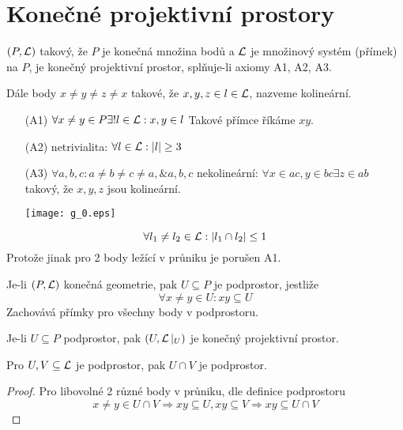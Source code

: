 \section{\texorpdfstring{Konečné projektivní prostory}{Konečné projektivní prostory}}

\begin{definition}\label{kpp:kpp}
    $(P,\operatorname{\mathcal{L}})$ takový, že $P$ je konečná množina bodů a $\operatorname{\mathcal{L}}$ je množinový systém (přímek) na $P$, je konečný projektivní prostor, splňuje-li axiomy A1, A2, A3.

    Dále body $x\neq y\neq z\neq x$ takové, že $x,y,z\in l\in\operatorname{\mathcal{L}}$, nazveme kolineární.

    \begin{itemize}
        \item[(A1)] $\forall x\neq y\in P\exists! l\in \operatorname{\mathcal{L}}: x,y\in l$
		Takové přímce říkáme $xy$.
        \item[(A2)] netrivialita: $\forall l \in \operatorname{\mathcal{L}}: |l| \geq 3$
	\item[(A3)]  $\forall a,b,c: a\neq b\neq c\neq a, \& a,b,c$ nekolineární: $\forall x\in ac, y\in bc\exists z\in ab$ takový, že $x,y,z$ jsou kolineární.

	\texttt{[image: g\_0.eps]}
    \end{itemize}
\end{definition}

\begin{observation}
	\[ \forall l_1 \ne l_2 \in \operatorname{\mathcal{L}} : |l_1 \cap l_2| \leq 1\]
	Protože jinak pro 2 body ležící v průniku je porušen A1.
\end{observation}

\begin{definition}[Podprostor]\label{kpp:subspace}
    Je-li $(P, \operatorname{\mathcal{L}})$ konečná geometrie, pak $U \subseteq P$ je podprostor, jestliže
    \[ \forall x\neq y\in U: xy\subseteq U \]
    Zachovává přímky pro všechny body v podprostoru.
\end{definition}

\begin{note}
    Je-li $U\subseteq P$ podprostor, pak $(U,\operatorname{\mathcal{L}}|_U)$ je konečný projektivní prostor.
\end{note}

\begin{lemma}
    Pro $U,V\subseteq \operatorname{\mathcal{L}}$ je podprostor, pak $U\cap V$ je podprostor.
\end{lemma}
\begin{proof}
	Pro libovolné 2 různé body v průniku, dle definice podprostoru
	\[ x \ne y \in U \cap V \Rightarrow xy \subseteq U, xy \subseteq V \Rightarrow xy \subseteq U \cap V \]
\end{proof}

